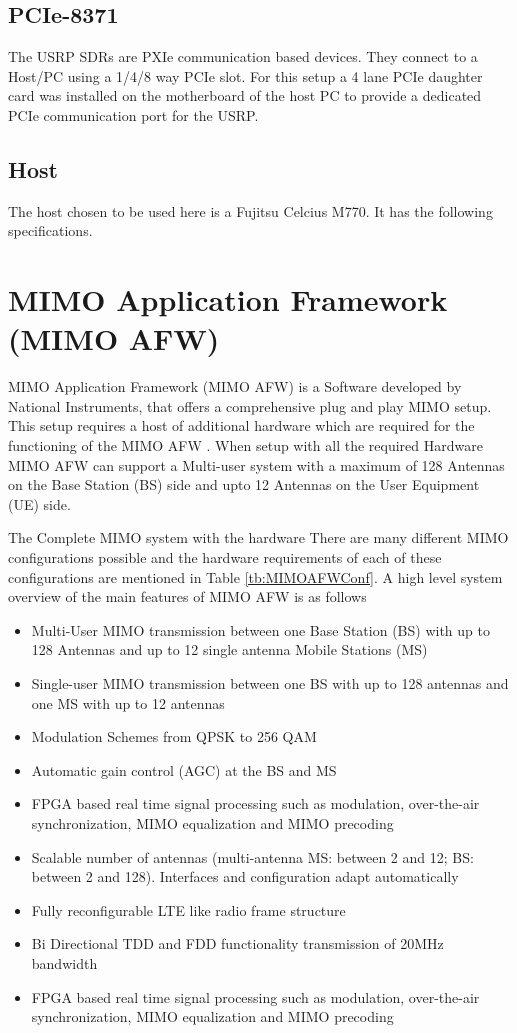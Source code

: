 \subsection{PCIe-8371}\label{ssec:PCIe-8371}
The USRP SDRs are PXIe communication based devices. They connect to a Host/PC using a 1/4/8 way PCIe slot. For this setup a 4 lane PCIe daughter card was installed on the motherboard of the host PC to provide a dedicated PCIe communication port for the USRP.

\subsection{Host}\label{ssec:host}
The host chosen to be used here is a Fujitsu Celcius M770. It has the following specifications.

\section{MIMO Application Framework (MIMO AFW)}\label{sec:MIMOAFW}
MIMO Application Framework (MIMO AFW) is a Software developed by National Instruments, that offers a comprehensive plug and play MIMO setup. This setup requires a host of additional hardware which are required for the functioning of the MIMO AFW \cite{MIMOAFWGettingStarted}. When setup with all the required Hardware MIMO AFW can support a Multi-user system with a maximum of 128 Antennas on the Base Station (BS) side and upto 12 Antennas on the User Equipment (UE) side.

The Complete MIMO system with the hardware There are many different MIMO configurations possible and the hardware requirements of each of these configurations are mentioned in Table \ref{tb:MIMOAFWConf}. A high level system overview of the main features of MIMO AFW is as follows

\begin{itemize}

    \item Multi-User MIMO transmission between one Base Station (BS) with up to 128 Antennas and up to 12 single antenna Mobile Stations (MS)
    \item Single-user MIMO transmission between one BS with up to 128 antennas and one MS with up to 12 antennas
    \item Modulation Schemes from QPSK to 256 QAM
    \item Automatic gain control (AGC) at the BS and MS
    \item FPGA based real time signal processing such as modulation, over-the-air synchronization, MIMO equalization and MIMO precoding
    \item Scalable number of antennas (multi-antenna MS: between 2 and 12; BS: between 2 and 128). Interfaces and configuration adapt automatically
    \item Fully reconfigurable LTE like radio frame structure
    \item Bi Directional TDD and FDD functionality transmission of 20MHz bandwidth
    \item FPGA based real time signal processing such as modulation, over-the-air synchronization, MIMO equalization and MIMO precoding
\end{itemize}

